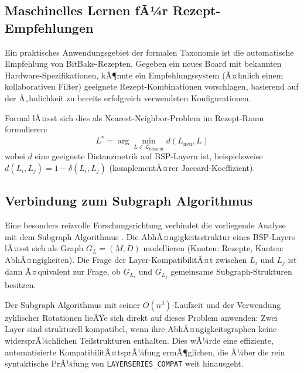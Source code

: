 ﻿\documentclass[a4paper,12pt]{article}
\theoremstyle{definition}
\begin{document}
\subsection{Maschinelles Lernen fÃ¼r Rezept-Empfehlungen}

Ein praktisches Anwendungsgebiet der formalen Taxonomie ist die
automatische Empfehlung von BitBake-Rezepten. Gegeben ein neues Board
mit bekannten Hardware-Spezifikationen, kÃ¶nnte ein Empfehlungssystem
(Ã¤hnlich einem kollaborativen Filter) geeignete Rezept-Kombinationen
vorschlagen, basierend auf der Ã„hnlichkeit zu bereits erfolgreich
verwendeten Konfigurationen.

Formal lÃ¤sst sich dies als Nearest-Neighbor-Problem im Rezept-Raum formulieren:
\[
L^* = \arg\min_{L \in \mathcal{L}_{\mathrm{bekannt}}} d(L_{\mathrm{neu}}, L)
\]
wobei $d$ eine geeignete Distanzmetrik auf BSP-Layern ist, beispielsweise
$d(L_i, L_j) = 1 - \delta(L_i, L_j)$ (komplementÃ¤rer Jaccard-Koeffizient).

\subsection{Verbindung zum Subgraph Algorithmus}

Eine besonders reizvolle Forschungsrichtung verbindet die vorliegende Analyse
mit dem Subgraph Algorithmus \cite{epp2026}.
Die AbhÃ¤ngigkeitsstruktur eines BSP-Layers lÃ¤sst sich als Graph
$G_L = (M, D)$ modellieren (Knoten: Rezepte, Kanten: AbhÃ¤ngigkeiten).
Die Frage der Layer-KompatibilitÃ¤t zwischen $L_i$ und $L_j$ ist dann Ã¤quivalent
zur Frage, ob $G_{L_i}$ und $G_{L_j}$ gemeinsame Subgraph-Strukturen besitzen.

Der Subgraph Algorithmus mit seiner $O(n^3)$-Laufzeit und der Verwendung zyklischer
Rotationen lieÃŸe sich direkt auf dieses Problem anwenden:
Zwei Layer sind strukturell kompatibel, wenn ihre AbhÃ¤ngigkeitsgraphen
keine widersprÃ¼chlichen Teilstrukturen enthalten. Dies wÃ¼rde eine effiziente,
automatisierte KompatibilitÃ¤tsprÃ¼fung ermÃ¶glichen, die Ã¼ber die rein
syntaktische PrÃ¼fung von \texttt{LAYERSERIES\_COMPAT} weit hinausgeht.
\end{document}

